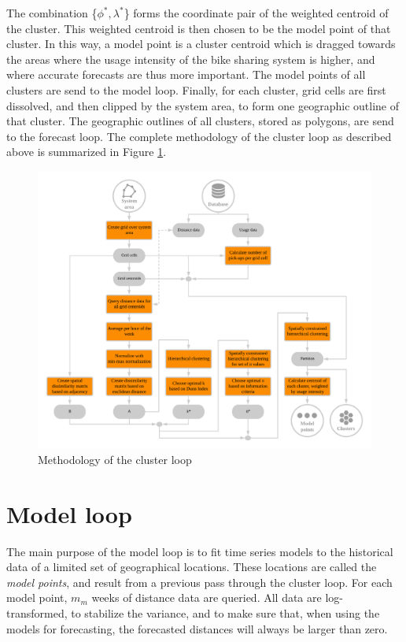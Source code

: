 \documentclass[12pt,oneside]{reedthesis}
\begin{document}
The combination \{\(\phi^{*}, \lambda^{*}\)\} forms the coordinate pair
of the weighted centroid of the cluster. This weighted centroid is then
chosen to be the model point of that cluster. In this way, a model point
is a cluster centroid which is dragged towards the areas where the usage
intensity of the bike sharing system is higher, and where accurate
forecasts are thus more important. The model points of all clusters are
send to the model loop. Finally, for each cluster, grid cells are first
dissolved, and then clipped by the system area, to form one geographic
outline of that cluster. The geographic outlines of all clusters, stored
as polygons, are send to the forecast loop. The complete methodology of
the cluster loop as described above is summarized in Figure
\ref{fig:clusterloop}.
\begin{figure}[h]
\includegraphics[width=\textwidth]{Figures/Clusterloop} \caption{Methodology of the cluster loop}\label{fig:clusterloop}
\end{figure}
\section{Model loop}\label{threeseven}

The main purpose of the model loop is to fit time series models to the
historical data of a limited set of geographical locations. These
locations are called the \emph{model points}, and result from a previous
pass through the cluster loop. For each model point, \(m_{m}\) weeks of
distance data are queried. All data are log-transformed, to stabilize
the variance, and to make sure that, when using the models for
forecasting, the forecasted distances will always be larger than zero.
\end{document}
